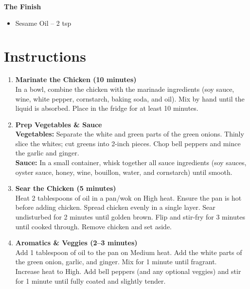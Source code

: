 \textbf{The Finish}
\begin{itemize}[itemsep=0.1em, label={\raisebox{-0.1ex}{\large\textbullet}}]
    \item[\measure] Sesame Oil – 2 tsp
\end{itemize}

\newpage
{}
\section*{Instructions}

\begin{enumerate}

    \item \textbf{Marinate the Chicken (10 minutes)} \\
          In a bowl, combine the chicken with the marinade ingredients (soy sauce,
          wine, white pepper, cornstarch, baking soda, and oil). Mix by hand until
          the liquid is absorbed. Place in the fridge for at least 10 minutes.

    \item \textbf{Prep Vegetables \& Sauce} \\
          \textbf{Vegetables:} Separate the white and green parts of the green onions.
          Thinly slice the whites; cut greens into 2-inch pieces. Chop bell peppers
          and mince the garlic and ginger. \\
          \textbf{Sauce:} In a small container, whisk together all sauce ingredients
          (soy sauces, oyster sauce, honey, wine, bouillon, water, and cornstarch)
          until smooth.

    \item \textbf{Sear the Chicken (5 minutes)} \\
          Heat 2 tablespoons of oil in a pan/wok on High heat. Ensure the pan is hot
          before adding chicken. Spread chicken evenly in a single layer. Sear
          undisturbed for 2 minutes until golden brown. Flip and stir-fry for 3
          minutes until cooked through. Remove chicken and set aside.

    \item \textbf{Aromatics \& Veggies (2--3 minutes)} \\
          Add 1 tablespoon of oil to the pan on Medium heat. Add the white parts of
          the green onion, garlic, and ginger. Mix for 1 minute until fragrant. \\
          Increase heat to High. Add bell peppers (and any optional veggies) and stir
          for 1 minute until fully coated and slightly tender.


\end{enumerate}
